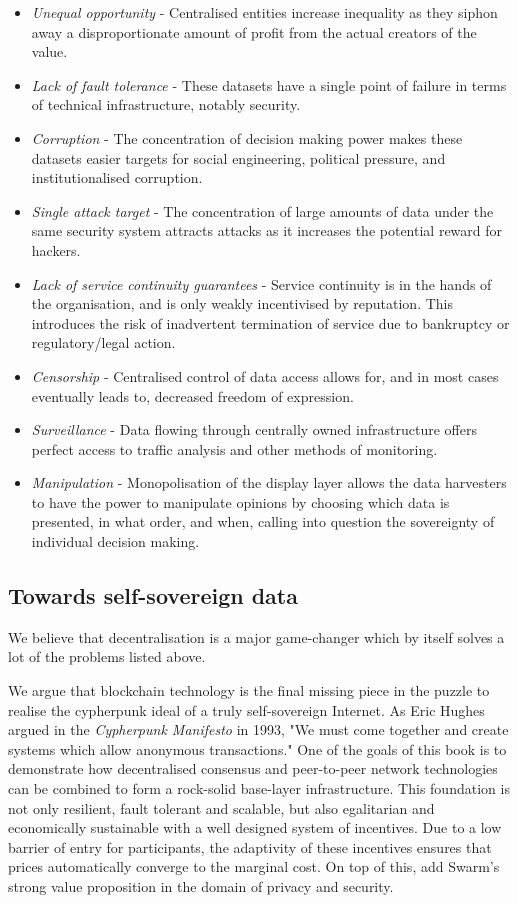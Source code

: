 \begin{itemize}[noitemsep]
    \item \emph{Unequal opportunity} - Centralised entities increase inequality as they siphon away a disproportionate amount of profit from the actual creators of the value.
    \item \emph{Lack of fault tolerance} - These datasets have a single point of failure in terms of technical infrastructure, notably security.
    \item \emph{Corruption} - The concentration of decision making power makes these datasets easier targets for social engineering, political pressure, and institutionalised corruption.
    \item \emph{Single attack target} - The concentration of large amounts of data under the same security system attracts attacks as it increases the potential reward for hackers. 
    \item \emph{Lack of service continuity guarantees} - Service continuity is in the hands of the organisation, and is only weakly incentivised by reputation. This introduces the risk of inadvertent termination of service due to bankruptcy or regulatory/legal action.
    \item \emph{Censorship} - Centralised control of data access allows for, and in most cases eventually leads to, decreased freedom of expression.
    \item \emph{Surveillance} - Data flowing through centrally owned infrastructure offers perfect access to traffic analysis and other methods of monitoring.
    \item \emph{Manipulation} - Monopolisation of the display layer allows the data harvesters to have the power to manipulate opinions by choosing which data is presented, in what order, and when, calling into question the sovereignty of individual decision making.
\end{itemize}


\subsection{Towards self-sovereign data \statusgreen} \label{sec:selfsovereigndata}

We believe that decentralisation is a major game-changer which by itself solves a lot of the problems listed above.

We argue that blockchain technology is the final missing piece in the puzzle to realise the cypherpunk ideal of a truly self-sovereign Internet. As Eric Hughes argued in the \emph{Cypherpunk Manifesto} \cite{hughes1993} in 1993, "We must come together and create systems which allow anonymous transactions." One of the goals of this book is to demonstrate how decentralised consensus and peer-to-peer network technologies can be combined to form a rock-solid base-layer infrastructure. This foundation is not only resilient, fault tolerant and scalable, but also egalitarian and economically sustainable with a well designed system of incentives. Due to a low barrier of entry for participants, the adaptivity of these incentives ensures that prices automatically converge to the marginal cost. On top of this, add Swarm's strong value proposition in the domain of privacy and security.

